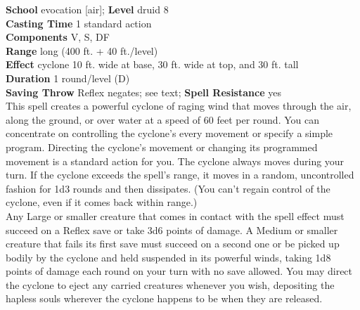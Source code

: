 \textbf{School} evocation [air]; \textbf{Level} druid 8\\
\textbf{Casting Time} 1 standard action\\
\textbf{Components} V, S, DF\\
\textbf{Range} long (400 ft. + 40 ft./level)\\
\textbf{Effect} cyclone 10 ft. wide at base, 30 ft. wide at top, and 30 ft. tall\\
\textbf{Duration} 1 round/level (D)\\
\textbf{Saving Throw} Reflex negates; see text; \textbf{Spell Resistance} yes\\
This spell creates a powerful cyclone of raging wind that moves through the air, along the ground, or over water at a speed of 60 feet per round. You can concentrate on controlling the cyclone's every movement or specify a simple program. Directing the cyclone's movement or changing its programmed movement is a standard action for you. The cyclone always moves during your turn. If the cyclone exceeds the spell's range, it moves in a random, uncontrolled fashion for 1d3 rounds and then dissipates. (You can't regain control of the cyclone, even if it comes back within range.)\\
Any Large or smaller creature that comes in contact with the spell effect must succeed on a Reflex save or take 3d6 points of damage. A Medium or smaller creature that fails its first save must succeed on a second one or be picked up bodily by the cyclone and held suspended in its powerful winds, taking 1d8 points of damage each round on your turn with no save allowed. You may direct the cyclone to eject any carried creatures whenever you wish, depositing the hapless souls wherever the cyclone happens to be when they are released.\\
